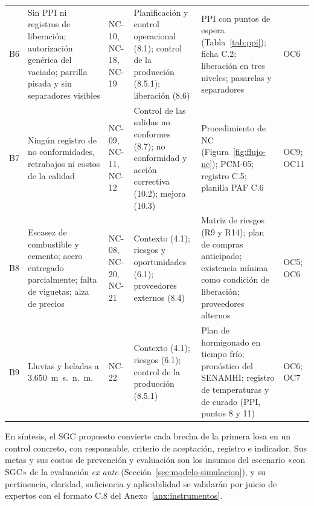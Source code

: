 \begin{longtable}{@{}P{0.6cm}P{3.0cm}P{1.45cm}P{3.0cm}P{5.15cm}P{1.95cm}@{}}
B6 & Sin PPI ni registros de liberación; autorización genérica del vaciado; parrilla pisada y sin separadores visibles & NC-10, NC-18, NC-19 & Planificación y control operacional (8.1); control de la producción (8.5.1); liberación (8.6) & PPI con puntos de espera (Tabla~\ref{tab:ppi}); ficha C.2; liberación en tres niveles; pasarelas y separadores & OC6 \\
B7 & Ningún registro de no conformidades, retrabajos ni costos de la calidad & NC-09, NC-11, NC-12 & Control de las salidas no conformes (8.7); no conformidad y acción correctiva (10.2); mejora (10.3) & Procedimiento de NC (Figura~\ref{fig:flujo-nc}); PCM-05; registro C.5; planilla PAF C.6 & OC9; OC11 \\
B8 & Escasez de combustible y cemento; acero entregado parcialmente; falta de viguetas; alza de precios & NC-08, NC-20, NC-21 & Contexto (4.1); riesgos y oportunidades (6.1); proveedores externos (8.4) & Matriz de riesgos (R9 y R14); plan de compras anticipado; existencia mínima como condición de liberación; proveedores alternos & OC5; OC6 \\
B9 & Lluvias y heladas a 3.650~m~s.~n.~m. & NC-22 & Contexto (4.1); riesgos (6.1); control de la producción (8.5.1) & Plan de hormigonado en tiempo frío; pronóstico del SENAMHI; registro de temperaturas y de curado (PPI, puntos 8 y 11) & OC6; OC7 \\
\end{longtable}
\vspace{-6pt}
\endgroup

En síntesis, el SGC propuesto convierte cada brecha de la primera losa en un control concreto, con responsable, criterio de aceptación, registro e indicador. Sus metas y sus costos de prevención y evaluación son los insumos del escenario «con SGC» de la evaluación \emph{ex ante} (Sección~\ref{sec:modelo-simulacion}), y su pertinencia, claridad, suficiencia y aplicabilidad se validarán por juicio de expertos con el formato C.8 del Anexo~\ref{anx:instrumentos}.
